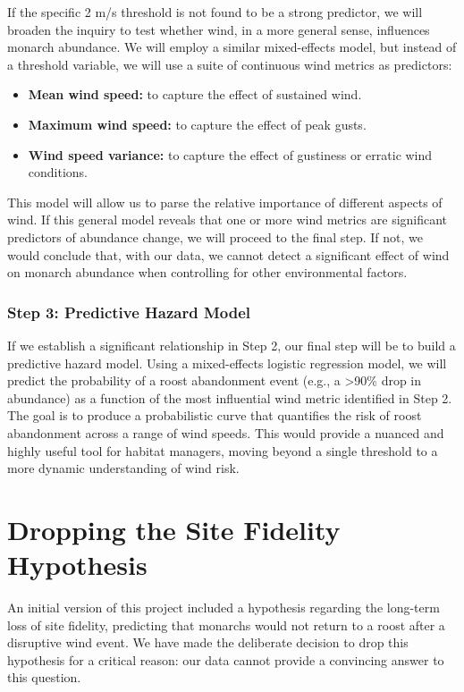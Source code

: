 If the specific 2 m/s threshold is not found to be a strong predictor, we will broaden the inquiry to test whether wind, in a more general sense, influences monarch abundance. We will employ a similar mixed-effects model, but instead of a threshold variable, we will use a suite of continuous wind metrics as predictors:
\begin{itemize}
    \item \textbf{Mean wind speed:} to capture the effect of sustained wind.
    \item \textbf{Maximum wind speed:} to capture the effect of peak gusts.
    \item \textbf{Wind speed variance:} to capture the effect of gustiness or erratic wind conditions.
\end{itemize}
This model will allow us to parse the relative importance of different aspects of wind. If this general model reveals that one or more wind metrics are significant predictors of abundance change, we will proceed to the final step. If not, we would conclude that, with our data, we cannot detect a significant effect of wind on monarch abundance when controlling for other environmental factors.

\subsubsection{Step 3: Predictive Hazard Model}

If we establish a significant relationship in Step 2, our final step will be to build a predictive hazard model. Using a mixed-effects logistic regression model, we will predict the probability of a roost abandonment event (e.g., a >90\% drop in abundance) as a function of the most influential wind metric identified in Step 2. The goal is to produce a probabilistic curve that quantifies the risk of roost abandonment across a range of wind speeds. This would provide a nuanced and highly useful tool for habitat managers, moving beyond a single threshold to a more dynamic understanding of wind risk.

\section{Dropping the Site Fidelity Hypothesis}

An initial version of this project included a hypothesis regarding the long-term loss of site fidelity, predicting that monarchs would not return to a roost after a disruptive wind event. We have made the deliberate decision to drop this hypothesis for a critical reason: our data cannot provide a convincing answer to this question.

